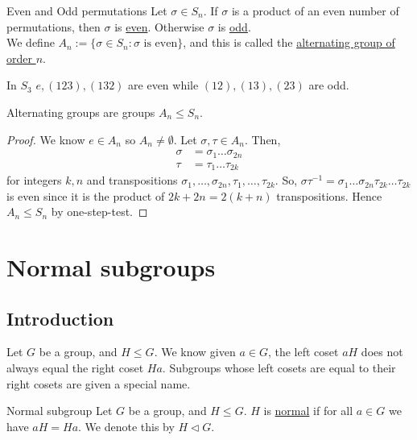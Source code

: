 \documentclass[12pt]{article}
\newcommand{\inv}{^{-1}}
\begin{document}
	\begin{mydef}{Even and Odd permutations}{}
		Let $\sigma\in S_n$. If $\sigma$ is a product of an even number of permutations, then $\sigma$ is \underline{even}. Otherwise $\sigma$ is \underline{odd}.\\
		
		We define $A_n:=\{\sigma\in S_n:\sigma\text{ is even}\}$, and this is called the \underline{alternating group of order $n$}.
	\end{mydef}
	
	\begin{myex}{}{}
		In $S_3$ $e, (123), (132)$ are even while $(12), (13), (23)$ are odd.
	\end{myex}
	
	\begin{mythm}{Alternating groups are groups}{}
		$A_n\leq S_n$.
		\begin{proof}
			We know $e\in A_n$ so $A_n\neq\emptyset$. Let $\sigma, \tau\in A_n$. Then,
			\begin{align*}
				\sigma&=\sigma_1\dots\sigma_{2n}\\
				\tau&=\tau_1\dots\tau_{2k}
			\end{align*}
			for integers $k, n$ and transpositions $\sigma_1, \dots, \sigma_{2n}, \tau_1, \dots, \tau_{2k}$. So, $\sigma\tau\inv=\sigma_1\dots\sigma_{2n}\tau_{2k}\dots\tau_{2k}$ is even since it is the product of $2k+2n=2(k+n)$ transpositions. Hence $A_n\leq S_n$ by one-step-test.
		\end{proof}
	\end{mythm}
	
	\section{Normal subgroups}
	\subsection{Introduction}
	
	\begin{myrem}{}{}
		Let $G$ be a group, and $H\leq G$. We know given $a\in G$, the left coset $aH$ does not always equal the right coset $Ha$. Subgroups whose left cosets are equal to their right cosets are given a special name.
	\end{myrem}
	
	\begin{mydef}{Normal subgroup}{}
		Let $G$ be a group, and $H\leq G$. $H$ is \underline{normal} if for all $a\in G$ we have $aH=Ha$. We denote this by $H\lhd G$.
	\end{mydef}
	
\end{document}

